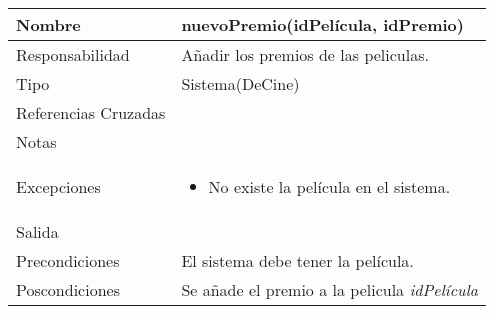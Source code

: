 \documentclass{article}
\begin{document}
\begin{table}[h]
\begin{tabular}{|l|l|l|l|l|l|}
\hline
\multicolumn{2}{|p{3cm}|}{Nombre} & \multicolumn{4}{p{10cm}|}{\textbf{nuevoPremio(idPelícula, idPremio)}}\\
\hline
\multicolumn{2}{|p{3cm}|}{Responsabilidad} & \multicolumn{4}{p{10cm}|}{Añadir los premios de las peliculas.} \\
\hline
\multicolumn{2}{|p{3cm}|}{Tipo} & \multicolumn{4}{p{10cm}|}{Sistema(DeCine)} \\
\hline
\multicolumn{2}{|p{3cm}|}{Referencias Cruzadas} & \multicolumn{4}{p{10cm}|}{} \\
\hline
\multicolumn{2}{|p{3cm}|}{Notas} & \multicolumn{4}{p{10cm}|}{} \\
\hline
\multicolumn{2}{|p{3cm}|}{Excepciones} & \multicolumn{4}{p{10cm}|}{\begin{itemize}
\item No existe la película en el sistema.
\end{itemize}} \\
\hline
\multicolumn{2}{|p{3cm}|}{Salida} & \multicolumn{4}{p{10cm}|}{} \\
\hline
\multicolumn{2}{|p{3cm}|}{Precondiciones} & \multicolumn{4}{p{10cm}|}{El sistema debe tener la película.} \\
\hline
\multicolumn{2}{|p{3cm}|}{Poscondiciones} & \multicolumn{4}{p{10cm}|}{Se añade el premio a la pelicula \textit{idPelícula}} \\
\hline
\end{tabular}
\end{table}
\end{document}
